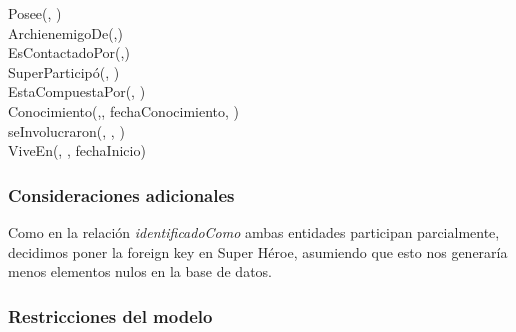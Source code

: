 Posee(, )\\

ArchienemigoDe(,)\\

EsContactadoPor(,)\\

SuperParticipó(, )\\

EstaCompuestaPor(, )\\

Conocimiento(,,
fechaConocimiento, )\\

seInvolucraron(, , )\\

ViveEn(, , fechaInicio)\\

\subsubsection{Consideraciones adicionales}\label{consideraciones-adicionales}

Como en la relación \emph{identificadoComo} ambas entidades participan
parcialmente, decidimos poner la foreign key en Super Héroe, asumiendo
que esto nos generaría menos elementos nulos en la base de datos.

\subsubsection{Restricciones del modelo}

